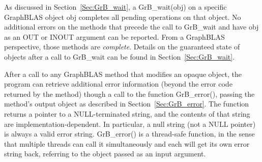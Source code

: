As discussed in Section~\ref{Sec:GrB_wait}, a {\sf GrB\_wait(obj)} on a
specific GraphBLAS object {\sf obj} completes all pending operations on
that object.  No additional errors on the methods that precede the call
to {\sf GrB\_wait} and have {\sf obj} as an {\sf OUT} or {\sf INOUT}
argument can be reported.  From a GraphBLAS perspective, those methods
are {\em complete}.  Details on the guaranteed state of objects after
a call to {\sf GrB\_wait} can be found in Section~\ref{Sec:GrB_wait}.

After a call to any GraphBLAS method that modifies an opaque object, the 
program can retrieve additional error information (beyond the error code 
returned by the method) though a call to the function {\sf GrB\_error()}, 
passing the method's output object as 
described in Section~\ref{Sec:GrB_error}.  The function returns a
pointer to a NULL-terminated string, and the contents of that string
are implementation-dependent. In particular, a null string (not a {\sf
NULL} pointer) is always a valid error string.  {\sf GrB\_error()} is
a thread-safe function, in the sense that multiple threads can call it
simultaneously and each will get its own error string back, referring
to the object passed as an input argument.
